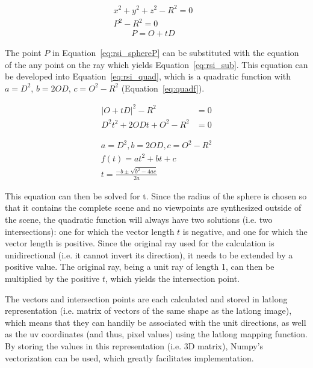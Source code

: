 \begin{align}
  x^2 + y^2 + z^2 - R^2 = 0&\label{eq:rsi_spherefull}\\ 
  P^2 - R^2 = 0&\label{eq:rsi_sphereP}
\end{align} 
\begin{align}
  P = O + tD& \label{eq:rsi_point}
\end{align} 

The point $P$ in Equation~\ref{eq:rsi_sphereP} can be substituted with the equation of the any point on the ray which yields Equation~\ref{eq:rsi_sub}. This equation can be developed into Equation~\ref{eq:rsi_quad}, which is a quadratic function with $a = D^2$, $b = 2OD$, $c = O^2-R^2$ (Equation~\ref{eq:quadf}).

\begin{align}
  |O + tD|^2 - R^2 &= 0  \label{eq:rsi_sub}\\
  D^2 t^2 + 2ODt + O^2 - R^2 &= 0 \label{eq:rsi_quad}
\end{align}

\begin{align}
  a = D^2, b = 2OD, c = O^2-R^2 \nonumber \\
  f(t) = at^2 + bt + c \label{eq:quadf}\\
  t = \frac{-b \pm \sqrt{b^2 - 4ac}}{2a} \label{eq:solvequadf}
\end{align}

This equation can then be solved for t. Since the radius of the sphere is chosen so that it contains the complete scene and no viewpoints are synthesized outside of the scene, the quadratic function will always have two solutions (i.e. two intersections): one for which the vector length $t$ is negative, and one for which the vector length is positive. Since the original ray used for the calculation is unidirectional (i.e. it cannot invert its direction), it needs to be extended by a positive value. The original ray, being a unit ray of length 1, can then be multiplied by the positive $t$, which yields the intersection point. 

The vectors and intersection points are each calculated and stored in latlong representation (i.e. matrix of vectors of the same shape as the latlong image), which means that they can handily be associated with the unit directions, as well as the uv coordinates (and thus, pixel values) using the latlong mapping function. By storing the values in this representation (i.e. 3D matrix), Numpy's vectorization can be used, which greatly facilitates implementation.

